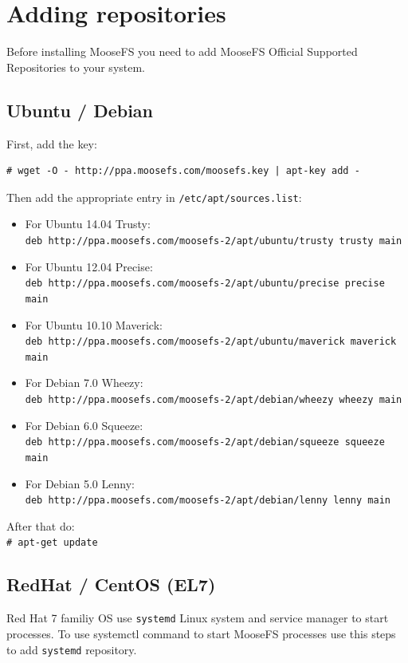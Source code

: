 \documentclass[a4paper,11pt,english]{report}
\def\code#1{\texttt{#1}}
\begin{document}
		\section{Adding repositories}
		Before installing MooseFS you need to add MooseFS Official Supported Repositories to your system.
			\subsection{Ubuntu / Debian}
			First, add the key:
			\begin{lstlisting}[caption={Adding the repo key}]
	# wget -O - http://ppa.moosefs.com/moosefs.key | apt-key add -
			\end{lstlisting}
			
			\bigskip
			Then add the appropriate entry in \code{/etc/apt/sources.list}:
			\begin{itemize}
				\item For Ubuntu 14.04 Trusty: \\
					\code{deb http://ppa.moosefs.com/moosefs-2/apt/ubuntu/trusty trusty main}
				\item For Ubuntu 12.04 Precise: \\
					\code{deb http://ppa.moosefs.com/moosefs-2/apt/ubuntu/precise precise main}
				\item For Ubuntu 10.10 Maverick: \\
					\code{deb http://ppa.moosefs.com/moosefs-2/apt/ubuntu/maverick maverick main}
				\item For Debian 7.0 Wheezy: \\
					\code{deb http://ppa.moosefs.com/moosefs-2/apt/debian/wheezy wheezy main}
				\item For Debian 6.0 Squeeze: \\
					\code{deb http://ppa.moosefs.com/moosefs-2/apt/debian/squeeze squeeze main}
				\item For Debian 5.0 Lenny: \\
					\code{deb http://ppa.moosefs.com/moosefs-2/apt/debian/lenny lenny main}
			\end{itemize}

			\bigskip
			After that do: \\
			\code{\# apt-get update}

			\subsection{RedHat / CentOS (EL7)}
			Red Hat 7 familiy OS use \code{systemd} Linux system and service manager to start processes. To use systemctl command to start MooseFS processes use this steps to add \code{systemd} repository.\\
			
\end{document}
